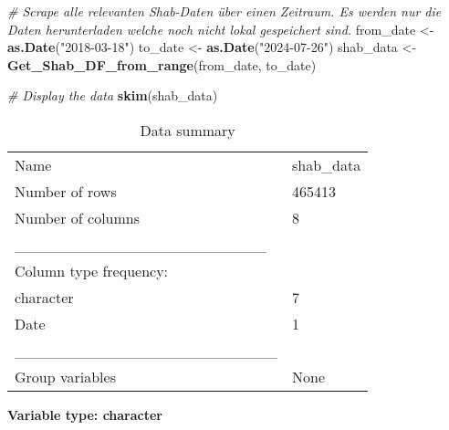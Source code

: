 \documentclass[
]{article}
\newenvironment{Shaded}{\begin{snugshade}}{\end{snugshade}}
\newcommand{\CommentTok}[1]{\textcolor[rgb]{0.56,0.35,0.01}{\textit{#1}}}
\newcommand{\FunctionTok}[1]{\textcolor[rgb]{0.13,0.29,0.53}{\textbf{#1}}}
\newcommand{\NormalTok}[1]{#1}
\newcommand{\OtherTok}[1]{\textcolor[rgb]{0.56,0.35,0.01}{#1}}
\newcommand{\StringTok}[1]{\textcolor[rgb]{0.31,0.60,0.02}{#1}}
\begin{document}
\begin{Shaded}
\begin{Highlighting}[]
\CommentTok{\# Scrape alle relevanten Shab{-}Daten über einen Zeitraum. Es werden nur die Daten herunterladen welche noch nicht lokal gespeichert sind.}
\NormalTok{from\_date }\OtherTok{\textless{}{-}} \FunctionTok{as.Date}\NormalTok{(}\StringTok{"2018{-}03{-}18"}\NormalTok{)}
\NormalTok{to\_date }\OtherTok{\textless{}{-}} \FunctionTok{as.Date}\NormalTok{(}\StringTok{"2024{-}07{-}26"}\NormalTok{)}
\NormalTok{shab\_data }\OtherTok{\textless{}{-}} \FunctionTok{Get\_Shab\_DF\_from\_range}\NormalTok{(from\_date, to\_date)}

\CommentTok{\# Display the data}
\FunctionTok{skim}\NormalTok{(shab\_data)}
\end{Highlighting}
\end{Shaded}

\begin{longtable}[]{@{}ll@{}}
\caption{Data summary}\tabularnewline
\toprule\noalign{}
\endfirsthead
\endhead
\bottomrule\noalign{}
\endlastfoot
Name & shab\_data \\
Number of rows & 465413 \\
Number of columns & 8 \\
\_\_\_\_\_\_\_\_\_\_\_\_\_\_\_\_\_\_\_\_\_\_\_ & \\
Column type frequency: & \\
character & 7 \\
Date & 1 \\
\_\_\_\_\_\_\_\_\_\_\_\_\_\_\_\_\_\_\_\_\_\_\_\_ & \\
Group variables & None \\
\end{longtable}

\textbf{Variable type: character}
\end{document}
